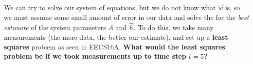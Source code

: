 \begin{enumerate}
  \ws {
    \vspace{75px}
  }

  \qitem We can try to solve our system of equations, but we do not know what $\vec{w}$ is, so we must assume some small amount of error in our data and solve the for the \textit{best estimate} of the system parameters $A$ and $\vec{b}$. \vskip 1pt
  To do this, we take many measurements (the more data, the better our estimate), and set up a \textbf{least squares} problem as seen in EECS16A.
  \textbf{What would the least squares problem be if we took measurements up to time step $t = 5$?}


\end{enumerate}
